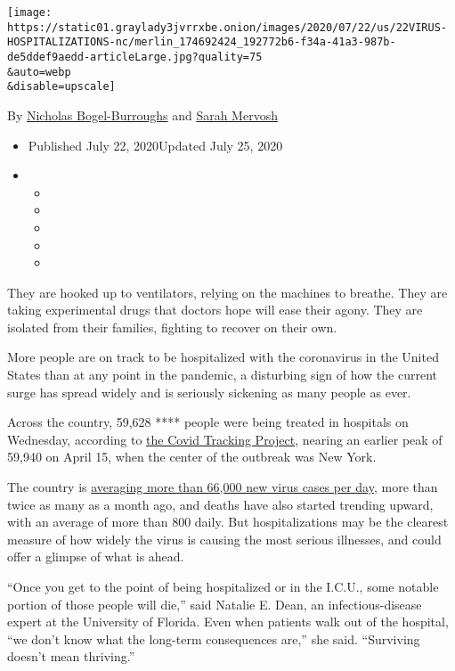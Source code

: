 \texttt{[image: https://static01.graylady3jvrrxbe.onion/images/2020/07/22/us/22VIRUS-HOSPITALIZATIONS-nc/merlin\_174692424\_192772b6-f34a-41a3-987b-de5ddef9aedd-articleLarge.jpg?quality=75\\\&auto=webp\\\&disable=upscale]}

By
\href{https://www.nytimes3xbfgragh.onion/by/nicholas-bogel-burroughs}{Nicholas
Bogel-Burroughs} and
\href{https://www.nytimes3xbfgragh.onion/by/sarah-mervosh}{Sarah
Mervosh}

\begin{itemize}
\item
  Published July 22, 2020Updated July 25, 2020
\item
  \begin{itemize}
  \item
  \item
  \item
  \item
  \item
  \end{itemize}
\end{itemize}

They are hooked up to ventilators, relying on the machines to breathe.
They are taking experimental drugs that doctors hope will ease their
agony. They are isolated from their families, fighting to recover on
their own.

More people are on track to be hospitalized with the coronavirus in the
United States than at any point in the pandemic, a disturbing sign of
how the current surge has spread widely and is seriously sickening as
many people as ever.

Across the country, 59,628 **** people were being treated in hospitals
on Wednesday, according to
\href{https://covidtracking.com/data/us-daily}{the Covid Tracking
Project}, nearing an earlier peak of 59,940 on April 15, when the center
of the outbreak was New York.

The country is
\href{https://www.nytimes3xbfgragh.onion/interactive/2020/us/coronavirus-us-cases.html}{averaging
more than 66,000 new virus cases per day}, more than twice as many as a
month ago, and deaths have also started trending upward, with an average
of more than 800 daily. But hospitalizations may be the clearest measure
of how widely the virus is causing the most serious illnesses, and could
offer a glimpse of what is ahead.

``Once you get to the point of being hospitalized or in the I.C.U., some
notable portion of those people will die,'' said Natalie E. Dean, an
infectious-disease expert at the University of Florida. Even when
patients walk out of the hospital, ``we don't know what the long-term
consequences are,'' she said. ``Surviving doesn't mean thriving.''

